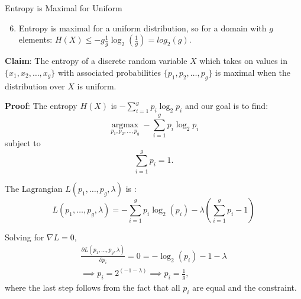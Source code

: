 \documentclass[11pt,compress,t,notes=noshow, xcolor=table]{beamer}
\begin{document}

\begin{vbframe}{Entropy is Maximal for Uniform}
\begin{enumerate}
\setcounter{enumi}{5}
\item Entropy is maximal for a uniform distribution, so for a domain with $g$ elements:  
      $H(X) \leq -g\frac{1}{g} \log_2(\frac{1}{g}) = log_2(g)$.
\end{enumerate}
\vspace{0.2cm}
\textbf{Claim}: The entropy of a discrete random variable $X$ which takes on values in $\{x_1,x_2, \ldots, x_g\}$ with associated probabilities $\{p_1,p_2, \ldots, p_g\}$ is maximal when the distribution over $X$ is uniform.

\lz
\textbf{Proof}: The entropy $H(X)$ is $- \sum_{i=1}^g p_i \log_2 p_i$ and our goal is to find:
  $$\underset{p_{1}, p_{2}, \ldots, p_{g}}{\operatorname{argmax}}-\sum_{i=1}^{g} p_{i} \log _{2} p_{i}$$
  subject to
  $$\sum_{i=1}^g p_i = 1.$$
  
  \framebreak
  The Lagrangian $L(p_1, \ldots, p_g, \lambda)$ is :
  $$L(p_1, \ldots, p_g, \lambda) = - \sum_{i=1}^g p_i \log_2(p_i) - \lambda \left( \sum_{i=1}^g p_i - 1 \right)$$
  
  Solving for $\nabla L = 0$,
  \begin{gather*}
    \frac{\partial L(p_1, \ldots, p_g, \lambda)}{\partial p_i} = 0 = - \log_2(p_i) - 1 - \lambda \\
    \implies p_i = 2^{(-1 - \lambda)} \implies p_i = \frac{1}{g},
  \end{gather*}
  where the last step follows from the fact that all $p_i$ are equal and the constraint.

\end{vbframe}
\end{document}
